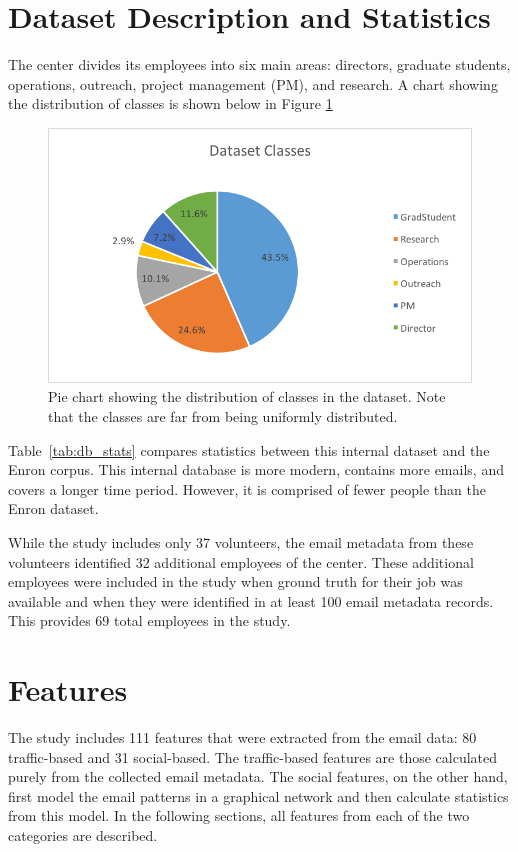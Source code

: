 \documentclass[12pt]{report}
\begin{document}
\section{Dataset Description and Statistics}
The center divides its employees into six main areas: directors, graduate students, operations, outreach, project management (PM), and research. 
A chart showing the distribution of classes is shown below in Figure \ref{fig:class_breakdown}
\begin{figure}[t]
    \centering
        \includegraphics[width=\columnwidth,trim={1mm 8mm 1mm 2mm},clip]{class_breakdown}
        \caption[Dataset class distribution pie chart]{Pie chart showing the distribution of classes in the dataset.  Note that the classes are far from being uniformly distributed.}
        \label{fig:class_breakdown}
\end{figure}

Table~\ref{tab:db_stats} compares statistics between this internal dataset and the Enron corpus.
This internal database is more modern, contains more emails, and covers a longer time period.
However, it is comprised of fewer people than the Enron dataset.

While the study includes only 37 volunteers, the email metadata from these volunteers identified 32 additional employees of the center.
These additional employees were included in the study when ground truth for their job was available and when they were identified in at least 100 email metadata records.
This provides 69 total employees in the study.

\section{Features}
The study includes 111 features that were extracted from the email data: 80 traffic-based and 31 social-based.
The traffic-based features are those calculated purely from the collected email metadata.
The social features, on the other hand, first model the email patterns in a graphical network and then calculate statistics from this model.
In the following sections, all features from each of the two categories are described. 
\end{document}
